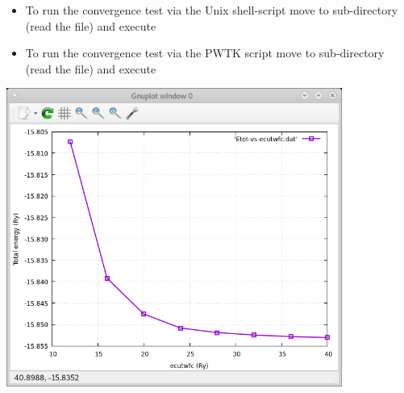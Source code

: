 \documentclass[landscape]{foils}
\begin{document}
\rightheader{}
% 
\begin{itemize}
\item To run the convergence test via the Unix shell-script move to
   sub-directory (read the
   file) and execute\\[0.5em]

\item To run the convergence test via the PWTK script move to
   sub-directory (read the
   file) and execute\\[0.5em]
\end{itemize}
\vspace{-1.5cm}
\begin{flushright}
\includegraphics[width=11cm]{figs/ecut.png}
\end{flushright}
\end{document}
